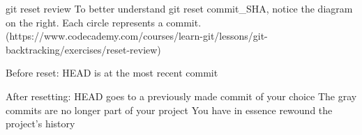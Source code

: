 git reset review
    To better understand git reset commit_SHA, notice the diagram on the right. Each circle represents a commit.(https://www.codecademy.com/courses/learn-git/lessons/git-backtracking/exercises/reset-review)
 
    Before reset:
        HEAD is at the most recent commit
    
    After resetting:
        HEAD goes to a previously made commit of your choice
        The gray commits are no longer part of your project
        You have in essence rewound the project’s history